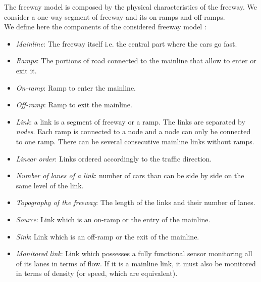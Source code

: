 The freeway model is composed by the physical characteristics of the freeway.
We consider a one-way segment of freeway and its on-ramps and off-ramps.\\
We define here the components of the considered freeway model :
\begin{itemize}
	\item \emph{Mainline}: The freeway itself i.e. the central part where the cars go fast.
	\item \emph{Ramps}: The portions of road connected to the mainline that allow to enter or exit it.
	\item \emph{On-ramp}: Ramp to enter the mainline.
	\item \emph{Off-ramp}: Ramp to exit the mainline.
	\item \emph{Link}: a link is a segment of freeway or a ramp. The links are separated by \emph{nodes}. Each ramp is connected to a node and a node can only be connected to one ramp. There can be several consecutive mainline links without ramps.
	\item \emph{Linear order}: Links ordered accordingly to the traffic direction.
	\item \emph{Number of lanes of a link}: number of cars than can be side by side on the same level of the link.
	\item \emph{Topography of the freeway}: The length of the links and their number of lanes.
	\item \emph{Source}: Link which is an on-ramp or the entry of the mainline.
	\item \emph{Sink}: Link which is an off-ramp or the exit of the mainline.
	\item \emph{Monitored link}: Link which possesses a fully functional sensor monitoring all of its lanes in terms of flow. If it is a mainline link, it must also be monitored in terms of density (or speed, which are equivalent).
\end{itemize}


